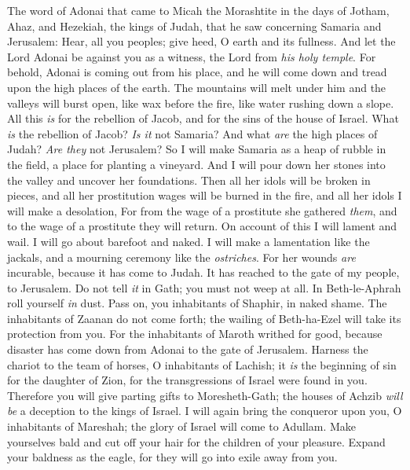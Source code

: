 
\begin{biblechapter} %
 The word of Adonai that came to Micah the Morashtite in the days of Jotham, Ahaz, and Hezekiah, the kings of Judah, that he saw concerning Samaria and Jerusalem:
\verse Hear, all you peoples; 
give heed, O earth and its fullness. 
And let the Lord Adonai be against you as a witness, 
the Lord from \textit{his holy temple}.
\verse For behold, Adonai is coming out from his place, 
and he will come down and tread upon the high places of the earth.
\verse The mountains will melt under him 
and the valleys will burst open, 
like wax before the fire, 
like water rushing down a slope.
\verse All this \textit{is} for the rebellion of Jacob, 
and for the sins of the house of Israel. 
What \textit{is} the rebellion of Jacob? 
\textit{Is it} not Samaria? 
And what \textit{are} the high places of Judah? 
\textit{Are they} not Jerusalem?
\verse So I will make Samaria as a heap of rubble in the field, 
a place for planting a vineyard. 
And I will pour down her stones into the valley 
and uncover her foundations.
\verse Then all her idols will be broken in pieces, 
and all her prostitution wages will be burned in the fire, 
and all her idols I will make a desolation, 
For from the wage of a prostitute she gathered \textit{them}, 
and to the wage of a prostitute they will return.
\verse On account of this I will lament and wail. 
I will go about barefoot and naked. 
I will make a lamentation like the jackals, 
and a mourning ceremony like the \textit{ostriches}.
\verse For her wounds \textit{are} incurable, 
because it has come to Judah. 
It has reached to the gate of my people, to Jerusalem.
\verse Do not tell \textit{it} in Gath; 
you must not weep at all. 
In Beth-le-Aphrah 
roll yourself \textit{in} dust.
\verse Pass on, you inhabitants of Shaphir, 
in naked shame. 
The inhabitants of Zaanan do not come forth; 
the wailing of Beth-ha-Ezel will take its protection from you.
\verse For the inhabitants of Maroth 
writhed for good, 
because disaster has come down from Adonai 
to the gate of Jerusalem.
\verse Harness the chariot to the team of horses, 
O inhabitants of Lachish; 
it \textit{is} the beginning of sin 
for the daughter of Zion, 
for the transgressions of Israel 
were found in you.
\verse Therefore you will give parting gifts 
to Moresheth-Gath; 
the houses of Achzib \textit{will be} a deception 
to the kings of Israel.
\verse I will again bring the conqueror upon you, 
O inhabitants of Mareshah; 
the glory of Israel 
will come to Adullam.
\verse Make yourselves bald 
and cut off your hair 
for the children of your pleasure. 
Expand your baldness as the eagle, 
for they will go into exile away from you.
\end{biblechapter}

